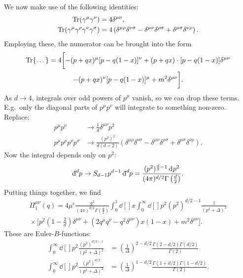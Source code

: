 
We now make use of the following identities:
\begin{align}
  \Tr(\gamma^{\mu}\gamma^{\nu}) &= 4 \delta^{\mu\nu},  \\
  \Tr(\gamma^{\mu} \gamma^{\rho} \gamma^{\nu} \gamma^{\sigma}) &= 4 \left( \delta^{\mu\rho} \delta^{\nu\sigma} - \delta^{\mu\nu} \delta^{\rho\sigma} + \delta^{\mu\sigma} \delta^{\nu\rho} \right).
\end{align}
Employing these, the numerator can be brought into the form
\begin{multline}
  \Tr \{ \dots \} = 4 \biggl[ - (p + q x)^{\mu} [p - q(1 - x)]^{\nu} + (p + q x) \cdot [p - q (1- x)] \delta^{\mu\nu} \\
  - (p + q x)^{\nu} [p - q (1 - x)]^{\mu} + m^2 \delta^{\mu\nu} \biggr].
\end{multline}
As $d \to 4$, integrals over odd powers of $p^{\mu}$ vanish, so we can drop these terms.
E.g.~only the diagonal parts of $p^{\mu} p^{\nu}$ will integrate to something non-zero. Replace:
\begin{align}
  p^{\mu} p^{\nu} &\to \frac{1}{d} \delta^{\mu\nu} p^2 \\
  p^{\mu} p^{\rho} p^{\nu} p^{\sigma} &\to \frac{(p^2)^2}{d (d + 2)} (\delta^{\mu\rho} \delta^{\nu\sigma} - \delta^{\mu\nu} \delta^{\rho\sigma} + \delta^{\mu\sigma} \delta^{\nu\rho}).
\end{align}
Now the integral depends only on $p^2$:
\begin{equation}
  \bdd[d]{p} \to S_{d-1} p^{d-1} \bdd[d]{p} = \frac{(p^2)^{\frac{d}{2} - 1} \dd[]{p^2}}{(4 \pi)^{d / 2} \Gamma \left( \frac{d}{2} \right)}.
\end{equation}
Putting things together, we find
\begin{multline}
  \Pi_1^{\mu\nu} (q) = 4 \mu^{\epsilon} \frac{g^2}{(4\pi)^{d / 2} \Gamma \left( \frac{d}{2} \right)} \int_{0}^{1}\dd[]{x} \int_{0}^{\infty}\dd[]{p^2} (p^2)^{d / 2 - 1} \frac{1}{(p^2 + \Delta)^2} \\
  {} \times \biggl[ p^2 \left( 1 - \frac{2}{d} \right) \delta^{\mu\nu} + \left( 2 q^{\mu} q^{\nu} - q^2 \delta^{\mu\nu} \right) x (1 - x) + m^2 \delta^{\mu\nu} \biggr].
\end{multline}
These are Euler-$B$-functions:
\begin{align}
  \int_{0}^{\infty}\dd[]{p^2}  \frac{(p^2)^{d / 2 - 1}}{(p^2 + \Delta)^2} &= \left( \frac{1}{\Delta} \right)^{2 - d / 2} \frac{\Gamma(2 - d / 2) \Gamma(d / 2)}{\Gamma(2)} \\
  \int_{0}^{\infty}\dd[]{p^2}  \frac{(p^2)^{d / 2}}{(p^2 + \Delta)^2} &= \left( \frac{1}{\Delta} \right)^{1 - d / 2} \frac{\Gamma(1 + d / 2) \Gamma(1 - d / 2)}{\Gamma(2)}.
\end{align}
